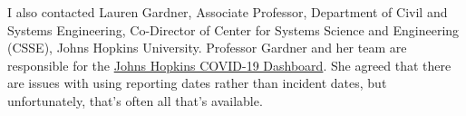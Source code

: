 \documentclass[10pt,reqno]{amsart}
\begin{document}







I also contacted Lauren Gardner, Associate Professor, Department of
Civil and Systems Engineering, Co-Director of Center for Systems
Science and Engineering (CSSE), Johns Hopkins University.  Professor
Gardner and her team are responsible for the
\href{https://coronavirus.jhu.edu/map.html}{Johns Hopkins COVID-19
  Dashboard}.  She agreed that there are issues with using reporting
dates rather than incident dates, but unfortunately, that's often all
that's available.\cite{Gardner2020Dates}

\end{document}
